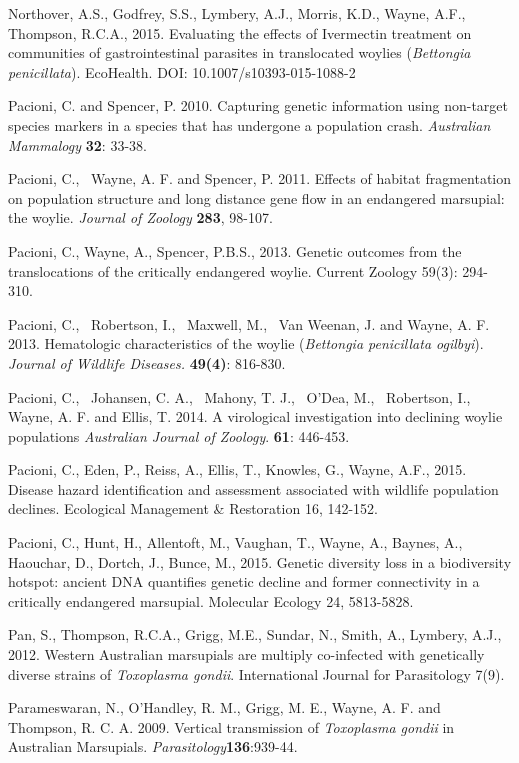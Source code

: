 \documentclass[version=last,
    paper=a4,                               %
    10pt,                                   %
    dvipsnames,
    oneside,                              %
    headings=openany,                       %
    open=any,
    BCOR=7mm,                               %
    DIV=15,     %
]{scrbook}
\begin{document}
Northover, A.S., Godfrey, S.S., Lymbery, A.J., Morris, K.D., Wayne,
A.F., Thompson, R.C.A., 2015. Evaluating the effects of Ivermectin
treatment on communities of gastrointestinal parasites in translocated
woylies (\emph{Bettongia penicillata}). EcoHealth. DOI:
10.1007/s10393-015-1088-2

Pacioni, C. and Spencer, P. 2010. Capturing genetic information using
non-target species markers in a species that has undergone a population
crash. \emph{Australian Mammalogy} \textbf{32}: 33-38.

Pacioni, C.,~ Wayne, A. F. and Spencer, P. 2011. Effects of habitat
fragmentation on population structure and long distance gene flow in an
endangered marsupial: the woylie. \emph{Journal of Zoology}
\textbf{283}, 98-107.

Pacioni, C., Wayne, A., Spencer, P.B.S., 2013. Genetic outcomes from the
translocations of the critically endangered woylie. Current Zoology
59(3): 294-310.

Pacioni, C.,~ Robertson, I.,~ Maxwell, M.,~ Van Weenan, J. and Wayne, A.
F. 2013. Hematologic characteristics of the woylie (\emph{Bettongia
penicillata ogilbyi}). \emph{Journal of Wildlife Diseases.}
\textbf{49(4)}: 816-830.

Pacioni, C.,~ Johansen, C. A.,~ Mahony, T. J.,~ O'Dea, M.,~ Robertson,
I.,~ Wayne, A. F. and Ellis, T. 2014. A virological investigation into
declining woylie populations \emph{Australian Journal of Zoology}.
\textbf{61}: 446-453.

Pacioni, C., Eden, P., Reiss, A., Ellis, T., Knowles, G., Wayne, A.F.,
2015. Disease hazard identification and assessment associated with
wildlife population declines. Ecological Management \& Restoration 16,
142-152.

Pacioni, C., Hunt, H., Allentoft, M., Vaughan, T., Wayne, A., Baynes,
A., Haouchar, D., Dortch, J., Bunce, M., 2015. Genetic diversity loss in
a biodiversity hotspot: ancient DNA quantifies genetic decline and
former connectivity in a critically endangered marsupial. Molecular
Ecology 24, 5813-5828.

Pan, S., Thompson, R.C.A., Grigg, M.E., Sundar, N., Smith, A., Lymbery,
A.J., 2012. Western Australian marsupials are multiply co-infected with
genetically diverse strains of \emph{Toxoplasma gondii}. International
Journal for Parasitology 7(9).

Parameswaran, N., O'Handley, R. M., Grigg, M. E., Wayne, A. F. and
Thompson, R. C. A. 2009. Vertical transmission of \emph{Toxoplasma
gondii} in Australian Marsupials.
\emph{Parasitology}\textbf{136}:939-44.
\end{document}
